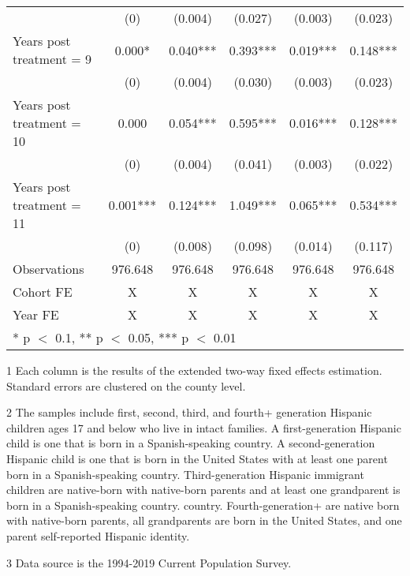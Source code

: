 \begin{table}[H]
{\begin{threeparttable}
\begin{tabular}[t]{lccccc}
 & (\num{0}) & (\num{0.004}) & (\num{0.027}) & (\num{0.003}) & (\num{0.023})\\
Years post treatment = 9 & \num{0.000}* & \num{0.040}*** & \num{0.393}*** & \num{0.019}*** & \num{0.148}***\\
 & (\num{0}) & (\num{0.004}) & (\num{0.030}) & (\num{0.003}) & (\num{0.023})\\
Years post treatment = 10 & \num{0.000} & \num{0.054}*** & \num{0.595}*** & \num{0.016}*** & \num{0.128}***\\
 & (\num{0}) & (\num{0.004}) & (\num{0.041}) & (\num{0.003}) & (\num{0.022})\\
Years post treatment = 11 & \num{0.001}*** & \num{0.124}*** & \num{1.049}*** & \num{0.065}*** & \num{0.534}***\\
 & (\num{0}) & (\num{0.008}) & (\num{0.098}) & (\num{0.014}) & (\num{0.117})\\
\midrule
Observations & \num{976,648} & \num{976,648} & \num{976,648} & \num{976,648} & \num{976,648}\\
Cohort FE & X & X & X & X & X\\
Year FE & X & X & X & X & X\\
\bottomrule
\multicolumn{6}{l}{\rule{0pt}{1em}* p $<$ 0.1, ** p $<$ 0.05, *** p $<$ 0.01}\\
\end{tabular}
\begin{tablenotes}
\small
\item[1] \footnotesize{Each column is the results of the extended two-way fixed effects estimation. 
                      Standard errors are clustered on the county level.}
\item[2] \footnotesize{The samples include first, second, third, and fourth+ generation Hispanic children ages 17 and below who live in intact families. 
                      A first-generation Hispanic child is one that is born in a Spanish-speaking country. 
                      A second-generation Hispanic child is one that is born in the United States with at least one parent born in a Spanish-speaking country.
                      Third-generation Hispanic immigrant children are native-born with native-born parents and at least one grandparent is born in a Spanish-speaking country.
                      country.
                      Fourth-generation+ are native born with native-born parents, all grandparents are born in the United States, and one parent self-reported Hispanic identity.}
\item[3] \footnotesize{Data source is the 1994-2019 Current Population Survey.}
\end{tablenotes}
\end{threeparttable}}
\end{table}
